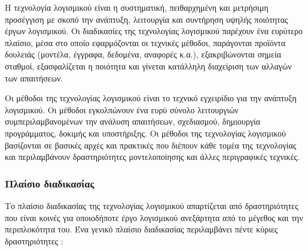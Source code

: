 \documentclass{report}
\begin{document}
Η τεχνολογία λογισμικού είναι η συστηματική, πειθαρχημένη και μετρήσιμη προσέγγιση με σκοπό την ανάπτυξη, λειτουργία και συντήρηση υψηλής ποιότητας έργων λογισμικού. Οι διαδικασίες της τεχνολογίας λογισμικού παρέχουν ένα ευρύτερο πλαίσιο, μέσα στο οποίο εφαρμόζονται οι τεχνικές μέθοδοι, παράγονται προϊόντα δουλειάς (μοντέλα, έγγραφα, δεδομένα, αναφορές κ.α.), εξακριβώνονται σημεία σταθμοί, εξασφαλίζεται η ποιότητα και γίνεται κατάλληλη διαχείριση των αλλαγών των απαιτήσεων.

Οι μέθοδοι της τεχνολογίας λογισμικού είναι το τεχνικό εγχειρίδιο για την ανάπτυξη λογισμικού. Οι μέθοδοι εγκολπώνουν ένα ευρύ σύνολο λειτουργιών συμπεριλαμβανομένων την ανάλυση απαιτήσεων, σχεδιασμού, δημιουργία προγράμματος, δοκιμής και υποστήριξης. Οι μέθοδοι της τεχνολογίας λογισμικού βασίζονται σε βασικές αρχές και πρακτικές που διέπουν κάθε τομέα της τεχνολογίας και περιλαμβάνουν δραστηριότητες μοντελοποίησης και άλλες περιγραφικές τεχνικές.

\subsubsection{Πλαίσιο διαδικασίας}

Το πλαίσιο διαδικασίας της τεχνολογίας λογισμικού απαρτίζεται από δραστηριότητες που είναι κοινές για οποιοδήποτε έργο λογισμικού ανεξάρτητα από το μέγεθος και την περιπλοκότητα του. Ένα γενικό πλαίσιο διαδικασίας περιλαμβάνει πέντε κύριες δραστηριότητες \cite{software_engineering_practiotioner_approach}:
\end{document}
